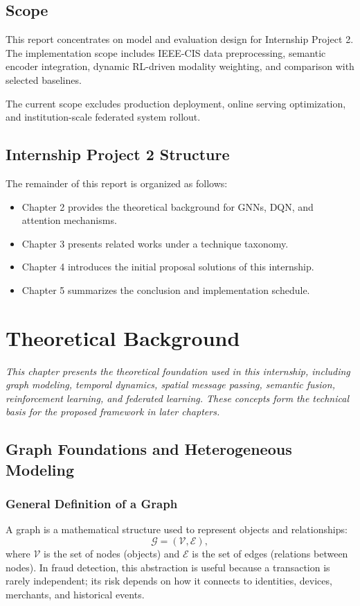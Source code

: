 \documentclass[12pt,a4paper]{report}
\newcommand{\chapterdesc}[1]{%
    \vspace{-0.6\baselineskip}
    \noindent\hspace*{1.5cm}\parbox{\dimexpr\textwidth-1.5cm\relax}{\textit{#1}}
    \par\vspace{0.3\baselineskip}
}
\begin{document}
\section{Scope}
This report concentrates on model and evaluation design for Internship Project 2. The implementation scope includes IEEE-CIS data preprocessing, semantic encoder integration, dynamic RL-driven modality weighting, and comparison with selected baselines.

The current scope excludes production deployment, online serving optimization, and institution-scale federated system rollout.

\section{Internship Project 2 Structure}
The remainder of this report is organized as follows:
\begin{itemize}
    \item Chapter 2 provides the theoretical background for GNNs, DQN, and attention mechanisms.
    \item Chapter 3 presents related works under a technique taxonomy.
    \item Chapter 4 introduces the initial proposal solutions of this internship.
    \item Chapter 5 summarizes the conclusion and implementation schedule.
\end{itemize}

\chapter{Theoretical Background}
\chapterdesc{This chapter presents the theoretical foundation used in this internship, including graph modeling, temporal dynamics, spatial message passing, semantic fusion, reinforcement learning, and federated learning. These concepts form the technical basis for the proposed framework in later chapters.}

\section{Graph Foundations and Heterogeneous Modeling}
\subsection{General Definition of a Graph}
A graph is a mathematical structure used to represent objects and relationships:
\begin{equation}
\mathcal{G}=(\mathcal{V},\mathcal{E}),
\end{equation}
where $\mathcal{V}$ is the set of nodes (objects) and $\mathcal{E}$ is the set of edges (relations between nodes). In fraud detection, this abstraction is useful because a transaction is rarely independent; its risk depends on how it connects to identities, devices, merchants, and historical events.
\end{document}
